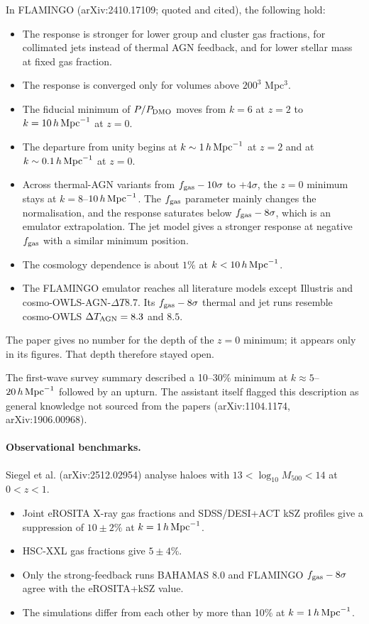 \documentclass[11pt,a4paper]{article}
\begin{document}
In FLAMINGO (arXiv:2410.17109; quoted and cited), the following hold:
\begin{itemize}
\item The response is stronger for lower group and cluster gas fractions, for collimated jets instead of thermal AGN feedback, and for lower stellar mass at fixed gas fraction.
\item The response is converged only for volumes above $200^3$ Mpc$^3$.
\item The fiducial minimum of $P/P_{\rm DMO}$ moves from $k=6$ at $z=2$ to $k=10\,h\,{\rm Mpc}^{-1}$ at $z=0$.
\item The departure from unity begins at $k\sim1\,h\,{\rm Mpc}^{-1}$ at $z=2$ and at $k\sim0.1\,h\,{\rm Mpc}^{-1}$ at $z=0$.
\item Across thermal-AGN variants from $f_{\rm gas}-10\sigma$ to $+4\sigma$, the $z=0$ minimum stays at $k=8$--$10\,h\,{\rm Mpc}^{-1}$. The $f_{\rm gas}$ parameter mainly changes the normalisation, and the response saturates below $f_{\rm gas}-8\sigma$, which is an emulator extrapolation. The jet model gives a stronger response at negative $f_{\rm gas}$ with a similar minimum position.
\item The cosmology dependence is about $1\%$ at $k<10\,h\,{\rm Mpc}^{-1}$.
\item The FLAMINGO emulator reaches all literature models except Illustris and cosmo-OWLS-AGN-$\Delta T$8.7. Its $f_{\rm gas}-8\sigma$ thermal and jet runs resemble cosmo-OWLS $\Delta T_{\rm AGN}=8.3$ and $8.5$.
\end{itemize}
The paper gives no number for the depth of the $z=0$ minimum; it appears only in its figures. That depth therefore stayed open.

The first-wave survey summary described a 10--30\% minimum at $k\approx5$--$20\,h\,{\rm Mpc}^{-1}$ followed by an upturn. The assistant itself flagged this description as general knowledge not sourced from the papers (arXiv:1104.1174, arXiv:1906.00968).

\paragraph{Observational benchmarks.} Siegel et al. (arXiv:2512.02954) analyse haloes with $13<\log_{10}M_{500}<14$ at $0<z<1$.
\begin{itemize}
\item Joint eROSITA X-ray gas fractions and SDSS/DESI+ACT kSZ profiles give a suppression of $10\pm2\%$ at $k=1\,h\,{\rm Mpc}^{-1}$.
\item HSC-XXL gas fractions give $5\pm4\%$.
\item Only the strong-feedback runs BAHAMAS 8.0 and FLAMINGO $f_{\rm gas}-8\sigma$ agree with the eROSITA+kSZ value.
\item The simulations differ from each other by more than 10\% at $k=1\,h\,{\rm Mpc}^{-1}$.
\end{itemize}
\end{document}
